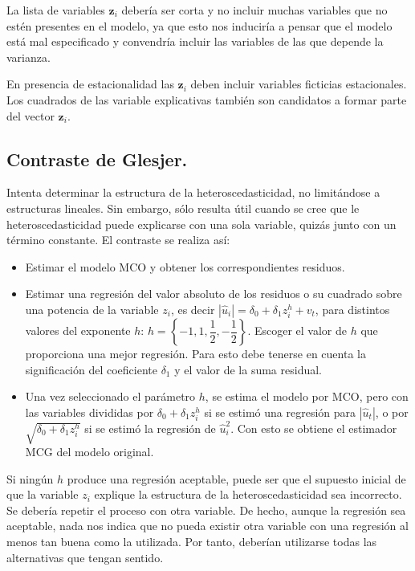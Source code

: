 La lista de variables $\boldsymbol{z}_{i}$ deber\'ia ser corta y no
incluir muchas variables que no est\'en presentes en el modelo, ya que
esto nos inducir\'ia a pensar que el modelo est\'a mal especificado y
convendr\'ia incluir las variables de las que depende la varianza.

En presencia de estacionalidad las $\boldsymbol{z}_{i}$ deben incluir
variables ficticias estacionales. Los cuadrados de las variable explicativas
tambi\'en son candidatos a formar parte del vector $\boldsymbol{z}_{i}$.


\subsection{Contraste de Glesjer.}

Intenta determinar la estructura de la heteroscedasticidad, no limit\'andose
a estructuras lineales. Sin embargo, s\'olo resulta \'util cuando se cree
que le heteroscedasticidad puede explicarse con una sola variable,
quiz\'as junto con un t\'ermino constante. El contraste se realiza as\'i:
\begin{itemize}
\item Estimar el modelo MCO y obtener los correspondientes residuos.
\item Estimar una regresi\'on del valor absoluto de los residuos o su cuadrado
sobre una potencia de la variable $z_{i}$, es decir $\left|\hat{u}_{i}\right|=\delta_{0}+\delta_{1}z_{i}^{h}+v_{t}$,
para distintos valores del exponente $h$: $h=\left\{ -1,1,\dfrac{1}{2},-\dfrac{1}{2}\right\} $.
Escoger el valor de $h$ que proporciona una mejor regresi\'on. Para
esto debe tenerse en cuenta la significaci\'on del coeficiente $\delta_{1}$
y el valor de la suma residual.
\item Una vez seleccionado el par\'ametro $h$, se estima el modelo por MCO,
pero con las variables divididas por $\delta_{0}+\delta_{1}z_{i}^{h}$
si se estim\'o una regresi\'on para $\left|\hat{u}_{t}\right|$, o por
$\sqrt{\delta_{0}+\delta_{1}z_{i}^{h}}$ si se estim\'o la regresi\'on
de $\hat{u}_{i}^{2}$. Con esto se obtiene el estimador MCG del modelo
original.
\end{itemize}
Si ning\'un $h$ produce una regresi\'on aceptable, puede ser que el supuesto
inicial de que la variable $z_{i}$ explique la estructura de la heteroscedasticidad
sea incorrecto. Se deber\'ia repetir el proceso con otra variable. De
hecho, aunque la regresi\'on sea aceptable, nada nos indica que no pueda
existir otra variable con una regresi\'on al menos tan buena como la
utilizada. Por tanto, deber\'ian utilizarse todas las alternativas que
tengan sentido.


